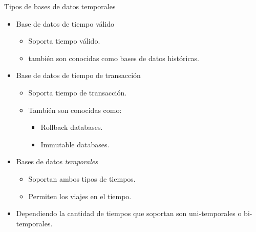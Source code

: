 \documentclass[handout, t, aspectratio=169]{beamer}
\begin{document}
\begin{frame}{Tipos de bases de datos temporales}
    \begin{itemize}
        \item Base de datos de tiempo válido\pause
        \begin{itemize}
            \item Soporta tiempo válido.
            \item también son conocidas como bases de datos históricas.
        \end{itemize}
        \pause
        \item Base de datos de tiempo de transacción\pause
        \begin{itemize}
            \item Soporta tiempo de transacción.\pause
            \item También son conocidas como:\pause
            \begin{itemize}
                \item Rollback databases.\pause
                \item Immutable databases.\pause
            \end{itemize}
        \end{itemize}
        
        \item Bases de datos \textit{temporales}\pause
        \begin{itemize}
            \item Soportan ambos tipos de tiempos.\pause
            \item Permiten los viajes en el tiempo.
        \end{itemize}\pause
        \item Dependiendo la cantidad de tiempos que soportan son uni-temporales o bi-temporales.
    \end{itemize}
\end{frame}
\end{document}
